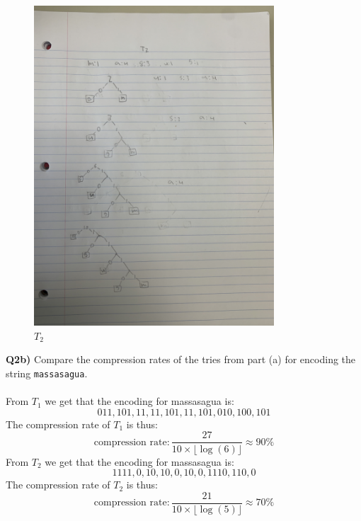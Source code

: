 \documentclass[12pt]{article}
\begin{document}
\begin{adjustwidth}{0em}{0pt}
\begin{figure}[tbhp]
\begin{center}
		\includegraphics[width=0.8\textwidth, angle = 270]{t2.jpg}
	\end{center}
	\caption{$T_2$}
	\label{figcaption}
\end{figure}
\end{adjustwidth}
\newpage 
\begin{adjustwidth}{0em}{0pt}
\textbf{Q2b)}  Compare the compression rates of the tries from part (a) for encoding the string {\tt massasagua}.\\\\
From $T_1$ we get that the encoding for massasagua is:
\[ 011, 101, 11, 11, 101, 11, 101, 010, 100, 101 \]
The compression rate of $T_1$ is thus:
\[ \text{compression rate} : \frac{27}{10\times\lfloor\log(6)\rfloor} \approx 90\%\]
From $T_2$ we get that the encoding for massasagua is:
\[ 1111, 0, 10, 10, 0, 10, 0, 1110, 110, 0 \]
The compression rate of $T_2$ is thus:
\[ \text{compression rate} : \frac{21}{10\times\lfloor\log(5)\rfloor} \approx 70\%\]
\end{adjustwidth}
\end{document}
